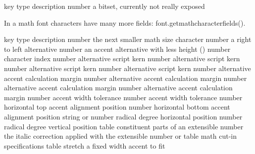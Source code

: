 \starttabulate[|l|l|pl|]
\FL
\BC key              \BC type    \BC description                            \NC \NR
\ML
\NC {}      \NC number  \NC a bitset, currently not really exposed \NC\NR
\stoptabulate

In a math font characters have many more fields: \showenginekeylist
{font.getmathcharacterfields()}.

\starttabulate[|l|l|pl|]
\FL
\BC key                      \BC type    \BC description \NC \NR
\ML
\NC {}          \NC number  \NC the next smaller math size character               \NC \NR
\NC {}           \NC number  \NC a right to left alternative                        \NC \NR
\NC {}       \NC number  \NC an accent alternative with less height (\OPENTYPE) \NC \NR
\NC {}             \NC number  \NC {} character index               \NC \NR
\HL
\NC {}          \NC number  \NC alternative script kern \NC \NR
\NC {}         \NC number  \NC alternative script kern \NC \NR
\NC {}       \NC number  \NC alternative script kern \NC \NR
\NC {}      \NC number  \NC alternative script kern \NC \NR
\HL
\NC {}        \NC number  \NC alternative accent calculation margin \NC \NR
\NC {}      \NC number  \NC alternative accent calculation margin \NC \NR
\NC {}       \NC number  \NC alternative accent calculation margin \NC \NR
\NC {}      \NC number  \NC alternative accent calculation margin \NC \NR
\HL
\NC {}     \NC number  \NC accent width tolerance \NC \NR
\NC {}  \NC number  \NC accent width tolerance \NC \NR
\HL
\NC {}        \NC number  \NC horizontal top accent alignment position    \NC \NR
\NC {}     \NC number  \NC horizontal bottom accent alignment position \NC \NR
\HL
\NC {}    \NC string  \NC {} or       \NC \NR
\NC {}     \NC number  \NC radical degree horizontal position \NC \NR
\NC {}     \NC number  \NC radical degree vertical position   \NC \NR
\HL
\NC {}            \NC table   \NC constituent parts of an extensible                \NC \NR
\NC {}      \NC number  \NC the italic correction applied with the extensible \NC \NR
\NC {} \NC number  \NC {} or             \NC \NR
\HL
\NC {}        \NC table   \NC math cut-in specifications \NC \NR
\HL
\NC {}       \NC table   \NC stretch a fixed width accent to fit \NC \NR
\LL
\stoptabulate

